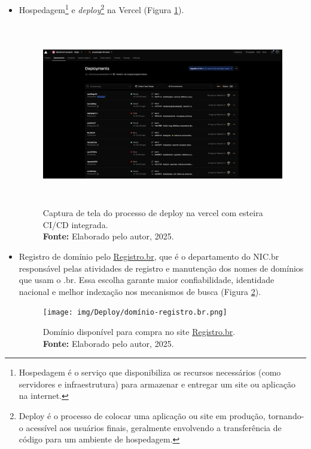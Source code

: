 \begin{itemize}
    \item Hospedagem\footnote{Hospedagem é o serviço que disponibiliza os recursos necessários (como servidores e infraestrutura) para armazenar e entregar um site ou aplicação na internet.} e \textit{deploy}\footnote{Deploy é o processo de colocar uma aplicação ou site em produção, tornando-o acessível aos usuários finais, geralmente envolvendo a transferência de código para um ambiente de hospedagem.} na Vercel (Figura \ref{fig:deploy_vercel}). 
\begin{figure}[H]
    \centering
    \includegraphics[height=8cm, keepaspectratio]{img/Deploy/deploy_vercel.png}
    \caption{ Captura de tela do processo de deploy na vercel com esteira CI/CD integrada. \\
        \textbf{Fonte:} Elaborado pelo autor, 2025.}
    \label{fig:deploy_vercel}
\end{figure}

    \item Registro de domínio pelo \href{www.registro.br}{Registro.br}, que é o departamento do NIC.br responsável pelas atividades de registro e manutenção dos nomes de domínios que usam o .br. Essa escolha garante maior confiabilidade, identidade nacional e melhor indexação nos mecanismos de busca (Figura \ref{fig:dominio_registro_br}).
\begin{figure}[H]
    \centering
    \texttt{[image: img/Deploy/domínio-registro.br.png]}
    \caption{ Domínio disponível para compra no site \href{www.registro.br}{Registro.br}. \\
        \textbf{Fonte:} Elaborado pelo autor, 2025.}
    \label{fig:dominio_registro_br}
\end{figure}


\end{itemize}
